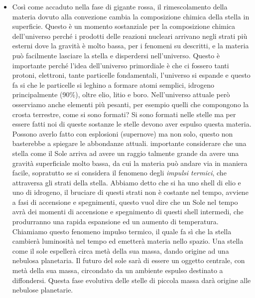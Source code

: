 \begin{itemize}
    \item Così come accaduto nella fase di gigante rossa, il rimescolamento della materia dovuto alla convezione cambia la composizione chimica della stella in superficie. Questo è un momento sostanziale per la composizione chimica dell'universo perché i prodotti delle reazioni nucleari arrivano negli strati più esterni dove la gravità è molto bassa, per i fenomeni su descritti, e la materia può facilmente lasciare la stella e disperdersi nell'universo. Questo è importante perché l'idea dell'universo primordiale è che ci fossero tanti protoni, elettroni, tante particelle fondamentali, l'universo si espande e questo fa si che le particelle si leghino a formare atomi semplici, idrogeno principalmente (90\%), oltre elio, litio e boro. Nell'universo attuale però osserviamo anche elementi più pesanti, per esempio quelli che compongono la crosta terrestre, come si sono formati? Si sono formati nelle stelle ma per essere fatti noi di queste sostanze le stelle devono aver espulso questa materia. Possono averlo fatto con esplosioni (supernove) ma non solo, questo non basterebbe a spiegare le abbondanze attuali. \E importante considerare che una stella come il Sole arriva ad avere un raggio talmente grande da avere una gravità superficiale molto bassa, da cui la materia può andare via in maniera facile, sopratutto se si considera il fenomeno degli \textit{impulsi termici}, che attraversa gli strati della stella. Abbiamo detto che si ha uno shell di elio e uno di idrogeno, il bruciare di questi strati non è costante nel tempo, avviene a fasi di accensione e spegnimenti, questo vuol dire che un Sole nel tempo avrà dei momenti di accensione e spegnimento di questi shell intermedi, che produrranno una rapida espansione ed un aumento di temperatura. Chiamiamo questo fenomeno impulso termico, il quale fa sì che la stella cambierà luminosità nel tempo ed emetterà materia nello spazio. Una stella come il sole espellerà circa metà della sua massa, dando origine ad una nebulosa planetaria. Il futuro del sole sarà di essere un oggetto centrale, con metà della sua massa, circondato da un ambiente espulso destinato a diffondersi. Questa fase evolutiva delle stelle di piccola massa darà origine alle nebulose planetarie. 
\end{itemize}

